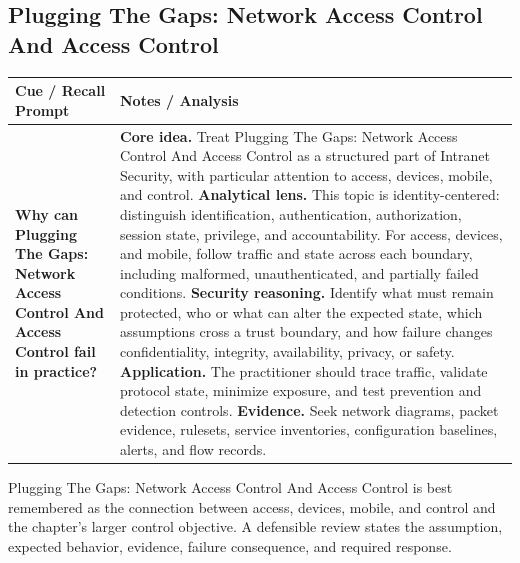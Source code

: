 \documentclass[11pt]{article}
\newcommand{\CornellHeader}{%
\rowcolor{Navy}\color{white}\bfseries Cue / Recall Prompt & \color{white}\bfseries Notes / Analysis\\\hline}
\newcommand{\CornellRow}[2]{%
\cellcolor{CueGray}\RaggedRight\textbf{#1} & \RaggedRight #2\\\hline}
\begin{document}
\subsection*{Plugging The Gaps: Network Access Control And Access Control}
\begin{longtable}{>{\RaggedRight\arraybackslash}p{}|>{\RaggedRight\arraybackslash}p{}}
\CornellHeader
\CornellRow{Why can Plugging The Gaps: Network Access Control And Access Control fail in practice?}{\textbf{Core idea.} Treat Plugging The Gaps: Network Access Control And Access Control as a structured part of Intranet Security, with particular attention to access, devices, mobile, and control. \textbf{Analytical lens.} This topic is identity-centered: distinguish identification, authentication, authorization, session state, privilege, and accountability. For access, devices, and mobile, follow traffic and state across each boundary, including malformed, unauthenticated, and partially failed conditions. \textbf{Security reasoning.} Identify what must remain protected, who or what can alter the expected state, which assumptions cross a trust boundary, and how failure changes confidentiality, integrity, availability, privacy, or safety. \textbf{Application.} The practitioner should trace traffic, validate protocol state, minimize exposure, and test prevention and detection controls. \textbf{Evidence.} Seek network diagrams, packet evidence, rulesets, service inventories, configuration baselines, alerts, and flow records.}
\end{longtable}
\begin{topicsummary}
Plugging The Gaps: Network Access Control And Access Control is best remembered as the connection between access, devices, mobile, and control and the chapter's larger control objective. A defensible review states the assumption, expected behavior, evidence, failure consequence, and required response.
\end{topicsummary}
\end{document}
